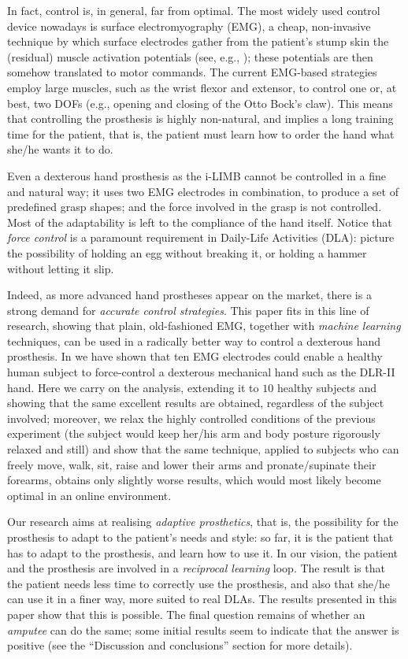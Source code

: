 In fact, control is, in general, far from optimal. The most widely
used control device nowadays is surface electromyography (EMG), a
cheap, non-invasive technique by which surface electrodes gather from
the patient's stump skin the (residual) muscle activation potentials
(see, e.g., \cite{deluca}); these potentials are then somehow
translated to motor commands. The current EMG-based strategies employ
large muscles, such as the wrist flexor and extensor, to control one
or, at best, two DOFs (e.g., opening and closing of the Otto Bock's
claw). This means that controlling the prosthesis is highly
non-natural, and implies a long training time for the patient, that
is, the patient must learn how to order the hand what she/he wants it
to do.

Even a dexterous hand prosthesis as the i-LIMB cannot be controlled in
a fine and natural way; it uses two EMG electrodes in combination, to
produce a set of predefined grasp shapes; and the force involved in
the grasp is not controlled. Most of the adaptability is left to the
compliance of the hand itself. Notice that \emph{force control} is a
paramount requirement in Daily-Life Activities (DLA): picture the
possibility of holding an egg without breaking it, or holding a hammer
without letting it slip.

Indeed, as more advanced hand prostheses appear on the market, there
is a strong demand for \emph{accurate control strategies}. This paper
fits in this line of research, showing that plain, old-fashioned EMG,
together with \emph{machine learning} techniques, can be used in a
radically better way to control a dexterous hand prosthesis. In
\cite{2008.ICRA,2008.BioCyb} we have shown that ten EMG electrodes
could enable a healthy human subject to force-control a dexterous
mechanical hand such as the DLR-II hand. Here we carry on the
analysis, extending it to $10$ healthy subjects and showing that the
same excellent results are obtained, regardless of the subject
involved; moreover, we relax the highly controlled conditions of the
previous experiment (the subject would keep her/his arm and body
posture rigorously relaxed and still) and show that the same
technique, applied to subjects who can freely move, walk, sit, raise
and lower their arms and pronate/supinate their forearms, obtains only
slightly worse results, which would most likely become optimal in an
online environment.

Our research aims at realising \emph{adaptive prosthetics}, that is,
the possibility for the prosthesis to adapt to the patient's needs and
style: so far, it is the patient that has to adapt to the prosthesis,
and learn how to use it. In our vision, the patient and the prosthesis
are involved in a \emph{reciprocal learning} loop. The result is that
the patient needs less time to correctly use the prosthesis, and also
that she/he can use it in a finer way, more suited to real DLAs. The
results presented in this paper show that this is possible. The final
question remains of whether an
\emph{amputee} can do the same; some initial results seem to indicate
that the answer is positive (see the ``Discussion and conclusions''
section for more details).

